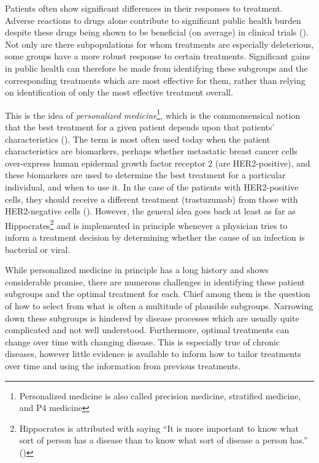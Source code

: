 \documentclass[12pt]{article}
\begin{document}

Patients often show significant differences in their responses to treatment. Adverse reactions to drugs alone contribute to significant public health burden despite these drugs being shown to be beneficial (on average) in clinical trials (\cite{Pirmohamed2004}). Not only are there subpopulations for whom treatments are especially deleterious, some groups have a more robust response to certain treatments. Significant gains in public health can therefore be made from identifying these subgroups and the corresponding treatments which are most effective for them, rather than relying on identification of only the most effective treatment overall.


This is the idea of \emph{personalized medicine}\footnote{Personalized medicine is also called precision medicine, stratified medicine, and P4 medicine}, which is the commonsensical notion that the best treatment for a given patient depends upon that patients' characteristics (\cite{pm-defn}). The term is most often used today when the patient characteristics are biomarkers, perhaps whether metastatic breast cancer cells  over-express human epidermal growth factor receptor 2 (are HER2-positive), and these biomarkers are used to determine the best treatment for a particular individual, and when to use it. In the case of the patients with HER2-positive cells, they should receive a different treatment (trastuzumab) from those with HER2-negative cells (\cite{Baselga2006}).
However, the general idea goes back at least as far as Hippocrates\footnote{Hippocrates is attributed with saying ``It is more important to know what sort of person has a disease than to know what sort of disease a person has.'' (\cite{Fischer2015})} and is implemented in principle whenever a physician tries to inform a treatment decision by determining whether the cause of an infection is bacterial or viral.

While personalized medicine in principle has a long history and shows considerable promise, there are numerous challenges in identifying these patient subgroups and the optimal treatment for each. Chief among them is the question of how to select from what is often a multitude of plausible subgroups. Narrowing down these subgroups is hindered by disease processes which are usually quite complicated and not well understood. Furthermore, optimal treatments can change over time with changing disease. This is especially true of chronic diseases, however little evidence is available to inform how to tailor treatments over time and using the information from previous treatments. 
\end{document}
